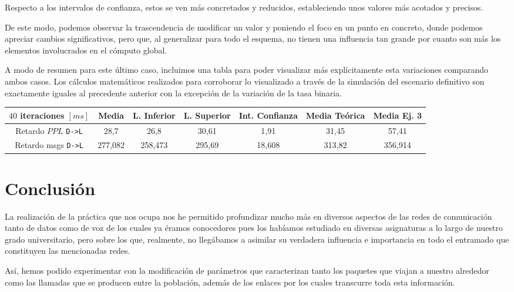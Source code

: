 \documentclass{article}[10pt]
\begin{document}
		Respecto a los intervalos de confianza, estos se ven más concretados y reducidos, estableciendo unos valores más acotados y precisos.

		De este modo, podemos observar la trascendencia de modificar un valor y poniendo el foco en un punto en concreto, donde podemos apreciar cambios significativos, pero que, al generalizar para todo el esquema, no tienen una influencia tan grande por cuanto son más los elementos involucrados en el cómputo global.

		A modo de resumen para este último caso, incluimos una tabla para poder visualizar más explícitamente esta variaciones comparando ambos casos. Los cálculos matemáticos realizados para corroborar lo visualizado a través de la simulación del escenario definitivo son exactamente iguales al precedente anterior con la excepción de la variación de la tasa binaria.

		\vskip 3mm

		\begin{center}
			\begin{tabular}{| c | c | c | c | c | c | c |}
						\hline
						$40$ iteraciones $[ms]$ & Media & L. Inferior & L. Superior & Int. Confianza & Media Teórica & Media Ej. 3\\
						\hline
						Retardo $PPL$ \texttt{D->L} & 28,7 & 26,8 & 30,61 & 1,91 & 31,45 & 57,41\\
						\hline
						Retardo msgs \texttt{D->L} & 277,082 & 258,473 & 295,69 & 18,608 & 313,82 & 356,914\\
						\hline
			\end{tabular}
		\end{center}

	\section{Conclusión}
		La realización de la práctica que nos ocupa nos he permitido profundizar mucho más en diversos aspectos de las redes de comunicación tanto de datos como de voz de los cuales ya éramos conocedores pues los habíamos estudiado en diversas asignaturas a lo largo de nuestro grado universitario, pero sobre los que, realmente, no llegábamos a asimilar su verdadera influencia e importancia en todo el entramado que constituyen las mencionadas redes.

		Así, hemos podido experimentar con la modificación de parámetros que caracterizan tanto los paquetes que viajan a nuestro alrededor como las llamadas que se producen entre la población, además de los enlaces por los cuales transcurre toda esta información.
\end{document}
